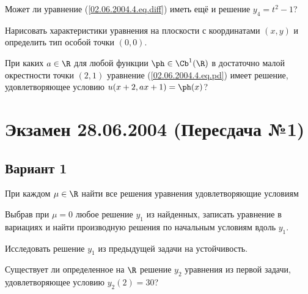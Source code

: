 \documentclass{article}
\begin{document}
\begin{problem}[2 балла]
Может ли уравнение (\ref{02.06.2004.4.eq.diff}) иметь ещё и решение $y_4 = t^2 -1$?
\end{problem}

\begin{problem}[2 балла]
Нарисовать характеристики уравнения
на плоскости с координатами $(x,y)$ и определить тип особой точки $(0,0)$.
\end{problem}

\begin{problem}[3 балла]
При каких $a \in \R$ для любой функции $\ph \in  \Cb^1(\R)$ в достаточно малой
окрестности точки $(2,1)$ уравнение (\ref{02.06.2004.4.eq.pd}) имеет решение, удовлетворяющее
условию $u(x+2,ax+1) = \ph(x)$?
\end{problem}


\section{Экзамен 28.06.2004 (Пересдача №1)}

\subsection{Вариант 1}

\begin{problem}[2 балла]
  При каждом $\mu \in \R$ найти все решения уравнения  удовлетворяющие
  условиям
\end{problem}

\begin{problem}[2]
Выбрав при $\mu=0$ любое решение $y_1$ из найденных,
записать уравнение в вариациях и найти производную решения по начальным условиям вдоль $y_1$.
\end{problem}

\begin{problem}[3 балла]
Исследовать решение $y_1$ из предыдущей задачи на устойчивость.
\end{problem}

\begin{problem}[2 балла]
Существует ли определенное на $\R$ решение $y_2$ уравнения из первой задачи, удовлетворяющее
условию $y_2(2)=30$?
\end{problem}
\end{document}
